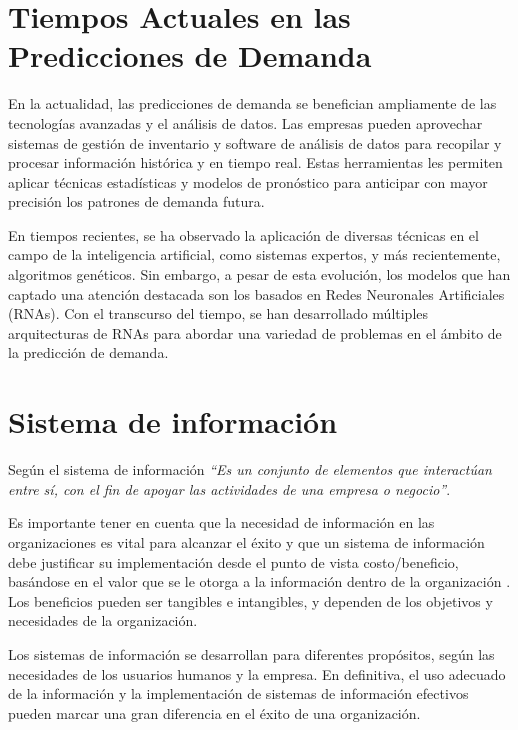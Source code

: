 \section{Tiempos Actuales en las Predicciones de Demanda}

En la actualidad, las predicciones de demanda se benefician ampliamente de las
tecnologías avanzadas y el análisis de datos. Las empresas pueden aprovechar
sistemas de gestión de inventario y software de análisis de datos para
recopilar y procesar información histórica y en tiempo real. Estas herramientas
les permiten aplicar técnicas estadísticas y modelos de pronóstico para
anticipar con mayor precisión los patrones de demanda futura.

En tiempos recientes, se ha observado la aplicación de diversas técnicas en el
campo de la inteligencia artificial, como sistemas expertos, y más
recientemente, algoritmos genéticos. Sin embargo, a pesar de esta evolución,
los modelos que han captado una atención destacada son los basados en Redes
Neuronales Artificiales (RNAs). Con el transcurso del tiempo, se han
desarrollado múltiples arquitecturas de RNAs para abordar una variedad de
problemas en el ámbito de la predicción de demanda.

\section{Sistema de información }

Según\cite{kendall2005analisis} el sistema de información\textit{ “Es un
  conjunto de elementos que interactúan entre sí, con el fin de apoyar las
  actividades de una empresa o negocio”}.

Es importante tener en cuenta que la necesidad de información en las
organizaciones es vital para alcanzar el éxito y que un sistema de información
debe justificar su implementación desde el punto de vista costo/beneficio,
basándose en el valor que se le otorga a la información dentro de la
organización \cite{kendall2005analisis}. Los beneficios pueden ser tangibles e
intangibles, y dependen de los objetivos y necesidades de la organización.

\vspace{1\baselineskip}
Los sistemas de información se desarrollan para diferentes propósitos, según las necesidades de los usuarios humanos y la empresa. En definitiva, el uso adecuado de la información y la implementación de sistemas de información efectivos pueden marcar una gran diferencia en el éxito de una organización.

